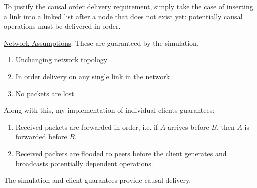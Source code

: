 \documentclass[12pt,a4paper,twoside,openright]{report}
\begin{document}
		To justify the causal order delivery requirement, simply take the case of inserting a link into a linked list after a node that does not exist yet: potentially causal operations must be delivered in order. 
		
		\underline{Network Assumptions}. These are guaranteed by the simulation.
		\begin{enumerate}
			\item Unchanging network topology
			\item In order delivery on any single link in the network
			\item No packets are lost
		\end{enumerate}
		
		Along with this, my implementation of individual clients guarantees:
		\begin{enumerate}
			\item Received packets are forwarded in order, i.e. if $A$ arrives before $B$, then $A$ is forwarded before $B$.
			\item Received packets are flooded to peers before the client generates and broadcasts potentially dependent operations.
		\end{enumerate} 
		
		The simulation and client guarantees provide causal delivery.
		
\end{document}

